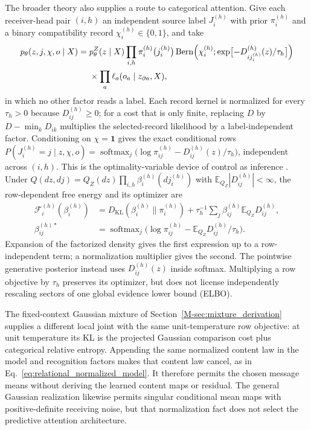 \documentclass[twoside,11pt]{article}
\begin{document}
The broader theory also supplies a route to categorical attention. Give each receiver-head pair $(i,h)$ an independent source label $J_i^{(h)}$ with prior $\pi_i^{(h)}$ and a binary compatibility record $\chi_i^{(h)}\in\{0,1\}$, and take
\begin{equation}
\begin{aligned}
p_\theta(z,j,\chi,o\mid X)={}&p_\theta^Z(z\mid X)\prod_{i,h}\pi_i^{(h)}\bigl(j_i^{(h)}\bigr)\operatorname{Bern}\Bigl(\chi_i^{(h)};\exp\bigl[-D_{ij_i^{(h)}}^{(h)}(z)/\tau_h\bigr]\Bigr)\\
&\times\prod_a\ell_a(o_a\mid z_{\partial a},X),
\end{aligned}
\label{eq:rg_bridge_record_joint}
\end{equation}
in which no other factor reads a label. Each record kernel is normalized for every $\tau_h>0$ because $D_{ij}^{(h)}\ge0$; for a cost that is only finite, replacing $D$ by $D-\min_kD_{ik}$ multiplies the selected-record likelihood by a label-independent factor. Conditioning on $\chi=\mathbf 1$ gives the exact conditional rows $P(J_i^{(h)}=j\mid z,\chi,o)=\operatorname{softmax}_j\bigl(\log\pi_{ij}^{(h)}-D_{ij}^{(h)}(z)/\tau_h\bigr)$, independent across $(i,h)$. This is the optimality-variable device of control as inference \citep{Levine2018}. Under $Q(dz,dj)=Q_Z(dz)\prod_{i,h}\beta_i^{(h)}(dj_i^{(h)})$ with $\mathbb E_{Q_Z}|D_{ij}^{(h)}|<\infty$, the row-dependent free energy and its optimizer are
\begin{align}
\mathcal F_i^{(h)}(\beta_i^{(h)})&=D_{\mathrm{KL}}(\beta_i^{(h)}\|\pi_i^{(h)})+\tau_h^{-1}\sum_j\beta_{ij}^{(h)}\mathbb E_{Q_Z}D_{ij}^{(h)},\\
\beta_{ij}^{(h)*}&=\operatorname{softmax}_j\bigl(\log\pi_{ij}^{(h)}-\mathbb E_{Q_Z}D_{ij}^{(h)}/\tau_h\bigr).
\label{eq:rg_bridge_row}
\end{align}
Expansion of the factorized density gives the first expression up to a row-independent term; a normalization multiplier gives the second. The pointwise generative posterior instead uses $D_{ij}^{(h)}(z)$ inside softmax. Multiplying a row objective by $\tau_h$ preserves its optimizer, but does not license independently rescaling sectors of one global evidence lower bound (ELBO).

The fixed-context Gaussian mixture of Section~\ref{M-sec:mixture_derivation} supplies a different local joint with the same unit-temperature row objective: at unit temperature its KL is the projected Gaussian comparison cost plus categorical relative entropy. Appending the same normalized content law in the model and recognition factors makes that content law cancel, as in Eq.~\eqref{eq:relational_normalized_model}. It therefore permits the chosen message means without deriving the learned content maps or residual. The general Gaussian realization likewise permits singular conditional mean maps with positive-definite receiving noise, but that normalization fact does not select the predictive attention architecture.
\end{document}
